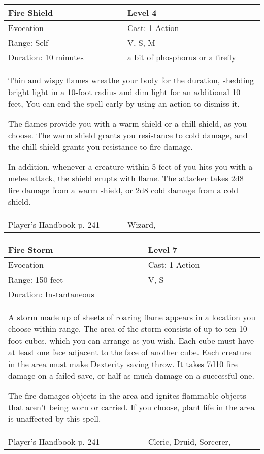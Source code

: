 \documentclass[11pt]{report}
\begin{document}
\begin{table}[H]
	\begin{tabular}{||p{6cm}|p{6cm}||}
		\hline\hline
		\bf{Fire Shield} & Level 4\\ \hline
		Evocation & Cast: 1 Action\\ \hline
		Range: Self & V, S, M\\ \hline
		Duration: 10 minutes & a bit of phosphorus or a firefly\\ \hline
		\multicolumn{2}{||p{12cm}||}{Thin and wispy flames wreathe your body for the duration, shedding bright light in a 10-foot radius and dim light for an additional 10 feet, You can end the spell early by using an action to dismiss it.

The flames provide you with a warm shield or a chill shield, as you choose. The warm shield grants you resistance to cold damage, and the chill shield grants you resistance to fire damage.

In addition, whenever a creature within 5 feet of you hits you with a melee attack, the shield erupts with flame. The attacker takes 2d8 fire damage from a warm shield, or 2d8 cold damage from a cold shield.}\\ \hline
Player's Handbook p. 241 & Wizard, \\ \hline\hline
	\end{tabular}
\end{table}

\begin{table}[H]
	\begin{tabular}{||p{6cm}|p{6cm}||}
		\hline\hline
		\bf{Fire Storm} & Level 7\\ \hline
		Evocation & Cast: 1 Action\\ \hline
		Range: 150 feet & V, S\\ \hline
		Duration: Instantaneous & \\ \hline
		\multicolumn{2}{||p{12cm}||}{A storm made up of sheets of roaring flame appears in a location you choose within range. 
The area of the storm consists of up to ten 10-foot cubes, which you can arrange as you wish. Each cube must have at least one face adjacent to the face of another cube. Each creature in the area must make  Dexterity saving throw. It takes 7d10 fire damage on a failed save, or half as much damage on a successful one.

The fire damages objects in the area and ignites flammable objects that aren’t being worn or carried. If you choose, plant life in the area is unaffected by this spell.}\\ \hline
Player's Handbook p. 241 & Cleric, Druid, Sorcerer, \\ \hline\hline
	\end{tabular}
\end{table}
\end{document}
